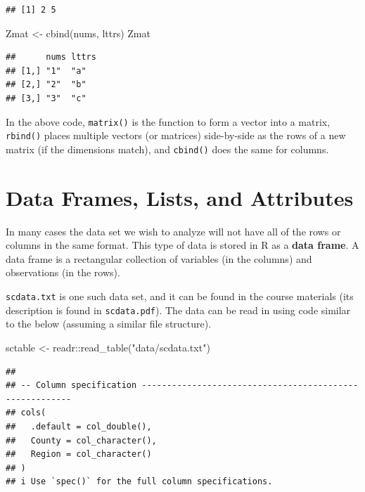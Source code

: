 \documentclass[
]{book}
\newenvironment{Shaded}{\begin{snugshade}}{\end{snugshade}}
\newcommand{\FunctionTok}[1]{\textcolor[rgb]{0.00,0.00,0.00}{#1}}
\newcommand{\NormalTok}[1]{#1}
\newcommand{\OtherTok}[1]{\textcolor[rgb]{0.56,0.35,0.01}{#1}}
\newcommand{\SpecialCharTok}[1]{\textcolor[rgb]{0.00,0.00,0.00}{#1}}
\newcommand{\StringTok}[1]{\textcolor[rgb]{0.31,0.60,0.02}{#1}}
\begin{document}
\begin{verbatim}
## [1] 2 5
\end{verbatim}

\begin{Shaded}
\begin{Highlighting}[]
\NormalTok{Zmat }\OtherTok{\textless{}{-}} \FunctionTok{cbind}\NormalTok{(nums, lttrs)}
\NormalTok{Zmat}
\end{Highlighting}
\end{Shaded}

\begin{verbatim}
##      nums lttrs
## [1,] "1"  "a"  
## [2,] "2"  "b"  
## [3,] "3"  "c"
\end{verbatim}

In the above code, \texttt{matrix()} is the function to form a vector into a matrix, \texttt{rbind()} places multiple vectors (or matrices) side-by-side as the rows of a new matrix (if the dimensions match), and \texttt{cbind()} does the same for columns.

\hypertarget{data-frames-lists-and-attributes}{%
\section{Data Frames, Lists, and Attributes}\label{data-frames-lists-and-attributes}}

In many cases the data set we wish to analyze will not have all of the rows or columns in the same format. This type of data is stored in R as a \textbf{data frame}. A data frame is a rectangular collection of variables (in the columns) and observations (in the rows).

\texttt{scdata.txt} is one such data set, and it can be found in the course materials (its description is found in \texttt{scdata.pdf}). The data can be read in using code similar to the below (assuming a similar file structure).

\begin{Shaded}
\begin{Highlighting}[]
\NormalTok{sctable }\OtherTok{\textless{}{-}}\NormalTok{ readr}\SpecialCharTok{::}\FunctionTok{read\_table}\NormalTok{(}\StringTok{"data/scdata.txt"}\NormalTok{)}
\end{Highlighting}
\end{Shaded}

\begin{verbatim}
## 
## -- Column specification --------------------------------------------------------
## cols(
##   .default = col_double(),
##   County = col_character(),
##   Region = col_character()
## )
## i Use `spec()` for the full column specifications.
\end{verbatim}
\end{document}
